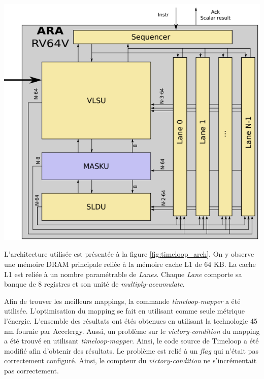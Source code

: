 \documentclass[10pt,letterpaper]{article}
\begin{document}
\begin{multicols}{2}
    {\centering
    \includegraphics[width=0.8\linewidth]{ara_arch.png}
    \captionsetup{hypcap=false}
    \label{fig:top_arch}}
    \bigskip

    L'architecture utilisée est présentée à la figure \ref{fig:timeloop_arch}. On y observe une mémoire DRAM principale reliée à 
    la mémoire cache L1 de 64 KB. La cache L1 est reliée à un nombre paramétrable de \textit{Lanes}. 
    Chaque \textit{Lane} comporte sa banque de 8 registres et son unité de \textit{multiply-accumulate}.

    Afin de trouver les meilleurs mappings, la commande \textit{timeloop-mapper} a été utilisée. 
    L'optimisation du mapping se fait en utilisant comme seule métrique l'énergie. L'ensemble des résultats
    ont étés obtenues en utilisant la technologie 45 nm fournie par Accelergy. Aussi, un problème sur le 
    \textit{victory-condition} du mapping a été trouvé en utilisant \textit{timeloop-mapper}. Ainsi, le code
    source de Timeloop a été modifié afin d'obtenir des résultats. Le problème est relié à un \textit{flag} 
    qui n'était pas correctement configuré. Ainsi, le compteur du \textit{victory-condition} ne s'incrémentait
    pas correctement.


\end{multicols}
\end{document}
